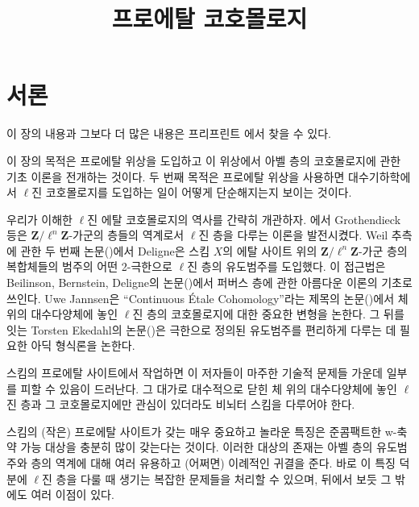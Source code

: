 

%


\title{프로에탈 코호몰로지}


\maketitle

\label{section-phantom}

\tableofcontents

\section{서론}
\label{section-introduction}

\noindent
이 장의 내용과 그보다 더 많은 내용은 프리프린트 \cite{BS}에서 찾을 수 있다.

\medskip\noindent
이 장의 목적은 프로에탈 위상을 도입하고 이 위상에서 아벨 층의
코호몰로지에 관한 기초 이론을 전개하는 것이다.
두 번째 목적은 프로에탈 위상을 사용하면 대수기하학에서
$\ell$진 코호몰로지를 도입하는 일이 어떻게 단순해지는지 보이는 것이다.

\medskip\noindent
우리가 이해한 $\ell$진 에탈 코호몰로지의 역사를 간략히 개관하자.
\cite[Expos\'es V and VI]{SGA5}에서 Grothendieck 등은
$\mathbf{Z}/\ell^n\mathbf{Z}$-가군의 층들의 역계로서
$\ell$진 층을 다루는 이론을 발전시켰다.
Weil 추측에 관한 두 번째 논문(\cite{WeilII})에서 Deligne은
스킴 $X$의 에탈 사이트 위의
$\mathbf{Z}/\ell^n\mathbf{Z}$-가군 층의 복합체들의 범주의
어떤 2-극한으로 $\ell$진 층의 유도범주를 도입했다.
이 접근법은 Beilinson, Bernstein, Deligne의 논문(\cite{BBD})에서
퍼버스 층에 관한 아름다운 이론의 기초로 쓰인다.
Uwe Jannsen은 ``Continuous \'Etale Cohomology''라는 제목의
논문(\cite{Jannsen})에서 체 위의 대수다양체에 놓인 $\ell$진 층의
코호몰로지에 대한 중요한 변형을 논한다.
그 뒤를 잇는 Torsten Ekedahl의 논문(\cite{Ekedahl})은
극한으로 정의된 유도범주를 편리하게 다루는 데 필요한
아딕 형식론을 논한다.

\medskip\noindent
스킴의 프로에탈 사이트에서 작업하면 이 저자들이 마주한
기술적 문제들 가운데 일부를 피할 수 있음이 드러난다.
그 대가로 대수적으로 닫힌 체 위의 대수다양체에 놓인 $\ell$진 층과
그 코호몰로지에만 관심이 있더라도 비뇌터 스킴을 다루어야 한다.

\medskip\noindent
스킴의 (작은) 프로에탈 사이트가 갖는 매우 중요하고 놀라운 특징은
준콤팩트한 w-축약 가능 대상을 충분히 많이 갖는다는 것이다.
이러한 대상의 존재는 아벨 층의 유도범주와 층의 역계에 대해
여러 유용하고 (어쩌면) 이례적인 귀결을 준다.
바로 이 특징 덕분에 $\ell$진 층을 다룰 때 생기는 복잡한 문제들을
처리할 수 있으며, 뒤에서 보듯 그 밖에도 여러 이점이 있다.




